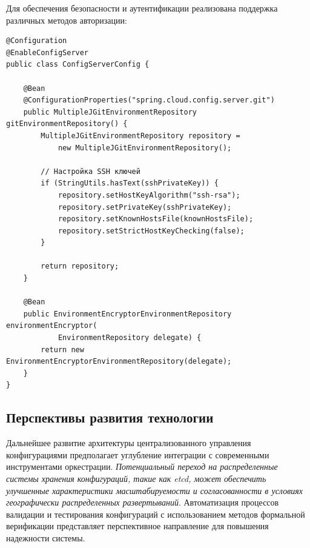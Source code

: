 Для обеспечения безопасности и аутентификации реализована поддержка различных методов авторизации:

\begin{verbatim}
@Configuration
@EnableConfigServer
public class ConfigServerConfig {

    @Bean
    @ConfigurationProperties("spring.cloud.config.server.git")
    public MultipleJGitEnvironmentRepository gitEnvironmentRepository() {
        MultipleJGitEnvironmentRepository repository =
            new MultipleJGitEnvironmentRepository();

        // Настройка SSH ключей
        if (StringUtils.hasText(sshPrivateKey)) {
            repository.setHostKeyAlgorithm("ssh-rsa");
            repository.setPrivateKey(sshPrivateKey);
            repository.setKnownHostsFile(knownHostsFile);
            repository.setStrictHostKeyChecking(false);
        }

        return repository;
    }

    @Bean
    public EnvironmentEncryptorEnvironmentRepository environmentEncryptor(
            EnvironmentRepository delegate) {
        return new EnvironmentEncryptorEnvironmentRepository(delegate);
    }
}
\end{verbatim}
\subsection{Перспективы развития технологии}

Дальнейшее развитие архитектуры централизованного управления конфигурациями предполагает углубление интеграции с современными инструментами оркестрации. \textit{Потенциальный переход на распределенные системы хранения конфигураций, такие как etcd, может обеспечить улучшенные характеристики масштабируемости и согласованности в условиях географически распределенных развертываний}. Автоматизация процессов валидации и тестирования конфигураций с использованием методов формальной верификации представляет перспективное направление для повышения надежности системы.
